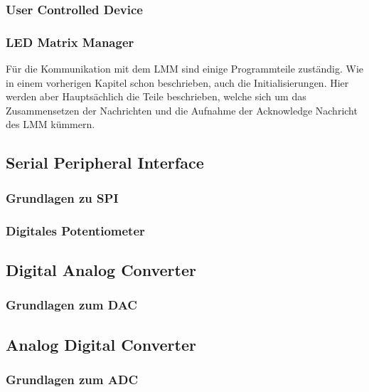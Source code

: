 \documentclass[paper=a4, 12pt]{scrreprt}
\begin{document}
			\subsubsection{User Controlled Device}
			\subsubsection{LED Matrix Manager}
			Für die Kommunikation mit dem LMM sind einige Programmteile zuständig. Wie in einem vorherigen Kapitel schon beschrieben, auch die Initialisierungen. Hier werden aber Hauptsächlich die Teile beschrieben, welche sich um das Zusammensetzen der Nachrichten und die Aufnahme der Acknowledge Nachricht des LMM kümmern. 
			\newpage
			
		\subsection{Serial Peripheral Interface}
			\subsubsection{Grundlagen zu SPI}
			\subsubsection{Digitales Potentiometer}
			\newpage
		\subsection{Digital Analog Converter}
			\subsubsection{Grundlagen zum DAC}
			\newpage
		\subsection{Analog Digital Converter}
			\subsubsection{Grundlagen zum ADC}
			\newpage



\appendix



\setcounter{lofdepth}{2}
\dipalistoffigures
\end{document}
